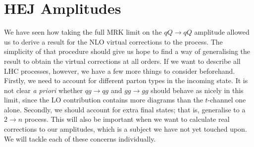 

\section{HEJ Amplitudes}

We have seen how taking the full MRK limit on the $qQ \to qQ$ amplitude allowed us to derive a result for the NLO virtual corrections to the process. The simplicity of that procedure should give us hope to find a way of generalising the result to obtain the virtual corrections at all orders. If we want to describe all LHC processes, however, we have a few more things to consider beforehand. Firstly, we need to account for different parton types in the incoming state. It is not clear \emph{a priori} whether $qg \to qg$ and $gg \to gg$ should behave as nicely in this limit, since the LO contribution contains more diagrams than the $t$-channel one alone. Secondly, we should account for extra final states; that is, generalise to a $2 \to n$ process. This will also be important when we want to calculate real corrections to our amplitudes, which is a subject we have not yet touched upon. We will tackle each of these concerns individually. 

